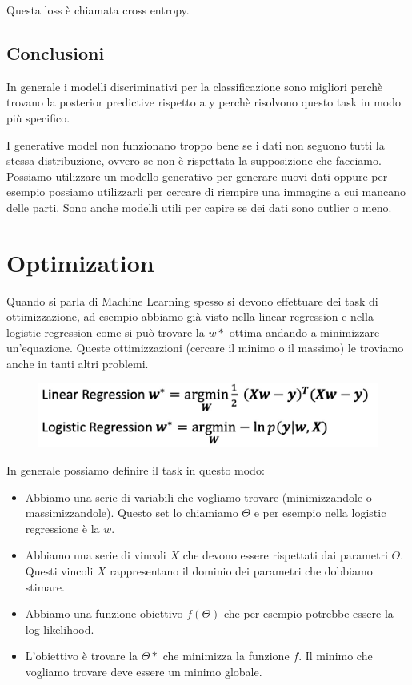 \documentclass[14pt]{extreport}
\begin{document}
Questa loss è chiamata cross entropy.

\section{Conclusioni}

In generale i modelli discriminativi per la classificazione sono migliori perchè trovano la posterior predictive rispetto a y perchè risolvono questo
task in modo più specifico.

I generative model non funzionano troppo bene se i dati non seguono tutti la stessa distribuzione, ovvero se non è rispettata la supposizione che
facciamo. Possiamo utilizzare un modello generativo per generare nuovi dati oppure per esempio possiamo utilizzarli per cercare di riempire una
immagine a cui mancano delle parti. Sono anche modelli utili per capire se dei dati sono outlier o meno.

\chapter{Optimization}

Quando si parla di Machine Learning spesso si devono effettuare dei task di ottimizzazione, ad esempio abbiamo già visto nella linear regression e
nella logistic regression come si può trovare la $w*$ ottima andando a minimizzare un'equazione. Queste ottimizzazioni (cercare il minimo o il
massimo) le troviamo anche in tanti altri problemi.

\begin{figure}[H]
\centering
\includegraphics[width=0.7\linewidth]{215.jpeg}
\end{figure}

In generale possiamo definire il task in questo modo:

\begin{itemize}
\item Abbiamo una serie di variabili che vogliamo trovare (minimizzandole o massimizzandole). Questo set lo chiamiamo $\Theta$ e per esempio nella
logistic regressione è la $w$.
\item Abbiamo una serie di vincoli $X$ che devono essere rispettati dai parametri $\Theta$. Questi vincoli $X$ rappresentano il dominio dei parametri
che dobbiamo stimare.
\item Abbiamo una funzione obiettivo $f(\Theta)$ che per esempio potrebbe essere la log likelihood.
\item L'obiettivo è trovare la $\Theta*$ che minimizza la funzione $f$. Il minimo che vogliamo trovare deve essere un minimo globale. 
\end{itemize}
\end{document}
